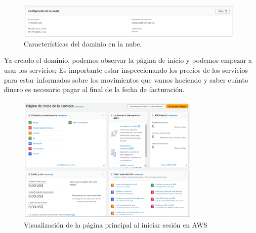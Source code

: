 \begin{figure}[h]
\centering
\includegraphics[width=\textwidth]{imagenes/cuenta.png}
\caption{Características del dominio en la nube.}
\end{figure}
\newpage

Ya creado el dominio, podemos observar la página de inicio y podemos empezar a usar los servicios; Es importante estar inspeccionando los precios de los servicios para estar informados sobre los movimientos que vamos haciendo y saber cuánto dinero es necesario pagar al final de la fecha de facturación.

\begin{figure}[h]
\centering
\includegraphics[width=0.8\textwidth]{imagenes/pag_principal.png}
\caption{Visualización de la página principal al iniciar sesión en AWS}
\end{figure}




